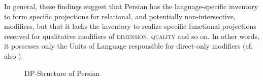 In general, these findings suggest that Persian has the language-specific inventory to form specific projections for relational, and potentially non-intersective, modifiers, but that it lacks the inventory to realize specific functional projections reserved for qualitative modifiers of \textsc{dimension}, \textsc{quality} and so on. In other words, it possesses only the Units of Language responsible for direct-only modifiers (cf. also \citealt[18]{kahne:2014:revisiting}).

 \begin{figure}[t]
\centering
\caption{DP-Structure of Persian}
\label{DP structure Persian}
\end{figure}

